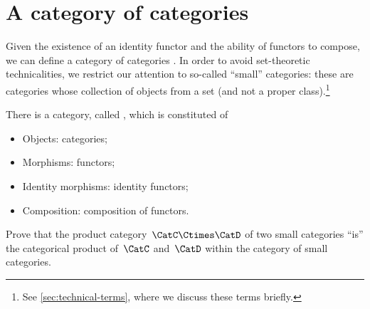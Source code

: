
\section{A category of categories}

Given the existence of an identity functor and the ability of functors to compose, we can define a category of categories \Category.
In order to avoid set-theoretic technicalities, we restrict our attention to so-called ``small'' categories: these are categories whose collection of objects from a set (and not a proper class).\footnote{See \cref{sec:technical-terms}, where we discuss these terms briefly.}

\begin{ctdefinition}
    \label{def:Category}
    There is a category, called \Category, which is constituted of
    \begin{itemize}
        \item Objects: categories;
        \item Morphisms: functors;
        \item Identity morphisms: identity functors;
        \item Composition: composition of functors.
    \end{itemize}
\end{ctdefinition}

\begin{gradedexercise}
    Prove that the product category~$\CatC \Ctimes \CatD$ of two small categories ``is'' the categorical product of~$\CatC$ and~$\CatD$ within the category of small categories.
\end{gradedexercise}

